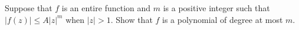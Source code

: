 Suppose that $f$ is an entire function and $m$ is a positive integer
such that $|f(z)|\leq A|z|^m$ when $|z|>1$. Show that $f$ is a
polynomial of degree at most $m$.
